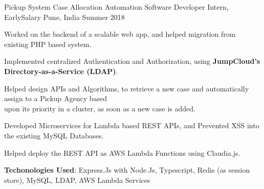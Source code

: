 \begin{cventries}

  \cventry
  {Pickup System Case Allocation Automation}
  {Software Developer Intern, EarlySalary}
  {Pune, India}
  {Summer 2018}
  {
    \begin{cvitems}
	\item Worked on the backend of a scalable web app, and helped migration from existing PHP based system.
	\item Implemented centralized Authentication and Authorization, using \textbf{JumpCloud’s Directory-as-a-Service (LDAP)}.
\item Helped design APIs and Algorithms, to retrieve a new case and automatically assign to a Pickup Agency based \\ upon its priority in a cluster, as soon as a new case is added.
\item Developed Microservices for Lambda based REST APIs, and Prevented XSS into the existing MySQL Databases.
\item Helped deploy the REST API as AWS Lambda Functions using Claudia.js.
\item \textbf{Techonologies Used}: Express.Js with Node.Js, Typescript, Redis (as session store), MySQL,
LDAP, AWS Lambda Services
    \end{cvitems}
  }

\end{cventries}
